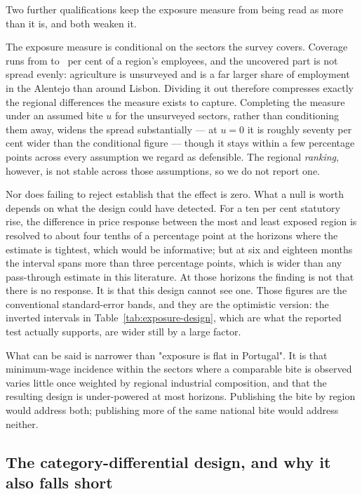 Two further qualifications keep the exposure measure from being read as more
than it is, and both weaken it.

The exposure measure is conditional on the sectors the survey covers. Coverage
runs from \ExposureCoverageMinPct{} to \ExposureCoverageMaxPct{}~per cent of a
region's employees, and the uncovered part is not spread evenly: agriculture is
unsurveyed and is a far larger share of employment in the Alentejo than around
Lisbon. Dividing it out therefore compresses exactly the regional differences
the measure exists to capture. Completing the measure under an assumed bite $u$
for the unsurveyed sectors, rather than conditioning them away, widens the
spread substantially --- at $u=0$ it is roughly seventy per cent wider than the
conditional figure --- though it stays within a few percentage points across
every assumption we regard as defensible. The regional \emph{ranking}, however,
is not stable across those assumptions, so we do not report one.

Nor does failing to reject establish that the effect is zero. What a null is
worth depends on what the design could have detected. For a ten per cent
statutory rise, the difference in price response between the most and least
exposed region is resolved to about four tenths of a percentage point at the
horizons where the estimate is tightest, which would be informative; but at six
and eighteen months the interval spans more than three percentage points, which
is wider than any pass-through estimate in this literature. At those horizons
the finding is not that there is no response. It is that this design cannot see
one. Those figures are the conventional standard-error bands, and they are the
optimistic version: the inverted intervals in
Table~\ref{tab:exposure-design}, which are what the reported test actually
supports, are wider still by a large factor.

What can be said is narrower than "exposure is flat in Portugal". It is that
minimum-wage incidence within the sectors where a comparable bite is observed
varies little once weighted by regional industrial composition, and that the
resulting design is under-powered at most horizons. Publishing the bite by
region would address both; publishing more of the same national bite would
address neither.

\subsection{The category-differential design, and why it also falls short}

